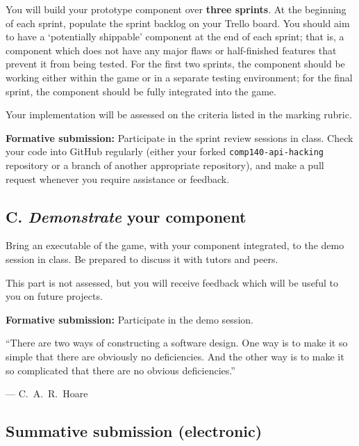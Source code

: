 \documentclass{../fal_assignment}
\begin{document}
You will build your prototype component over \textbf{three sprints}.
At the beginning of each sprint, populate the sprint backlog on your Trello board.
You should aim to have a `potentially shippable' component at the end of each sprint;
that is, a component which does not have any major flaws or half-finished features that prevent it from being tested.
For the first two sprints, the component should be working either within the game or in a separate testing environment;
for the final sprint, the component should be fully integrated into the game.

Your implementation will be assessed on the criteria listed in the marking rubric.

\textbf{Formative submission:} Participate in the sprint review sessions in class.
Check your code into GitHub regularly (either your forked \texttt{comp140-api-hacking} repository or a branch of another appropriate repository),
and make a pull request whenever you require assistance or feedback.

\subsection*{C. \emph{Demonstrate} your component}

Bring an executable of the game, with your component integrated, to the demo session in class.
Be prepared to discuss it with tutors and peers.

This part is not assessed, but you will receive feedback which will be useful to you on future projects.

\textbf{Formative submission:} Participate in the demo session.

\begin{marginquote}
    ``There are two ways of constructing a software design.
        One way is to make it so simple that there are obviously no deficiencies.
        And the other way is to make it so complicated that there are no obvious deficiencies.''
    
    --- C.\ A.\ R.\ Hoare
\end{marginquote}
\subsection*{Summative submission (electronic)}
\end{document}
